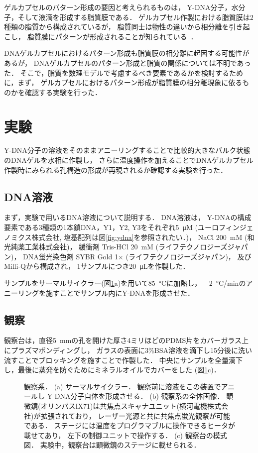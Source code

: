 ゲルカプセルのパターン形成の要因と考えられるものは，
Y-DNA分子，水分子，そして液滴を形成する脂質膜である．
ゲルカプセル作製における脂質膜は2種類の脂質から構成されているが\cite{morita2017formation}，
脂質同士は物性の違いから相分離を引き起こし，
脂質膜にパターンが形成されることが知られている~\cite{yanagisawa2014multiple}．

DNAゲルカプセルにおけるパターン形成も脂質膜の相分離に起因する可能性があるが，
DNAゲルカプセルのパターン形成と脂質の関係については不明であった．
そこで，脂質を数理モデルで考慮するべき要素であるかを検討するために，まず，
ゲルカプセルにおけるパターン形成が脂質膜の相分離現象に依るものかを確認する実験を行った．


\section{実験}
Y-DNA分子の溶液をそのままアニーリングすることで比較的大きなバルク状態のDNAゲルを水相に作製し，
さらに温度操作を加えることでDNAゲルカプセル作製時にみられる孔構造の形成が再現されるか確認する実験を行った．


\subsection{DNA溶液}
まず，実験で用いるDNA溶液について説明する．
DNA溶液は，
Y-DNAの構成要素である3種類の1本鎖DNA，Y1，Y2, Y3をそれぞれ\SI{5}{\micro M} (ユーロフィンジェノミクス株式会社, 塩基配列は図\ref{fig:ydna}を参照されたい．)，
NaCl \SI{200}{mM} (和光純薬工業株式会社)，
緩衝剤 Tris-HCl \SI{20}{mM} (ライフテクノロジーズジャパン)，
DNA蛍光染色剤 SYBR Gold 1× (ライフテクノロジーズジャパン)，
及びMilli-Qから構成され，
1サンプルにつき\SI{20}{\micro L}を作製した．

サンプルをサーマルサイクラー(図\ref{fig:equipments}a)を用いて\SI{85}{\celsius}に加熱し，
\SI{-2}{\celsius/min}のアニーリングを施すことでサンプル内にY-DNAを形成させた．


\subsection{観察}
観察台は，直径\SI{5}{mm}の孔を開けた厚さ4ミリほどのPDMS片をカバーガラス上にプラズマボンディングし，
ガラスの表面に3\%BSA溶液を滴下し15分後に洗い流すことでブロッキングを施すことで作製した．
中央にサンプルを全量滴下し，最後に蒸発を防ぐためにミネラルオイルでカバーをした
(図\ref{fig:equipments}c)．
\begin{figure}
    \centering
    
    \caption{
        観察系．
        (a) サーマルサイクラー．
            観察前に溶液をこの装置でアニールし
            Y-DNA分子自体を形成させる．
        (b) 観察系の全体画像．
            顕微鏡(オリンパスIX71)は共焦点スキャナユニット(横河電機株式会社)が拡張されており，
            レーザー光源と共に共焦点蛍光観察が可能である．
            ステージには温度をプログラマブルに操作できるヒータが載せてあり，
            左下の制御ユニットで操作する．
        (c) 観察台の模式図．
            実験中，観察台は顕微鏡のステージに載せられる．
    }
    \label{fig:equipments}
\end{figure}

